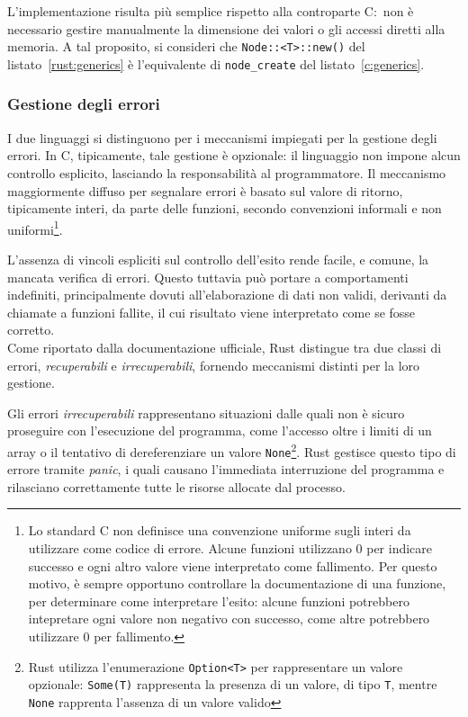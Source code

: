 L'implementazione risulta più semplice rispetto alla controparte C:\ non è necessario gestire manualmente la dimensione dei valori o gli accessi diretti alla memoria.
A tal proposito, si consideri che \texttt{Node::<T>::new()} del listato~\ref{rust:generics} è l'equivalente di \texttt{node\_create} del listato~\ref{c:generics}.

\subsubsection{Gestione degli errori}
I due linguaggi si distinguono per i meccanismi impiegati per la gestione degli errori.
In C, tipicamente, tale gestione è opzionale: il linguaggio non impone alcun controllo esplicito, lasciando la responsabilità al programmatore.
Il meccanismo maggiormente diffuso per segnalare errori è basato sul valore di ritorno, tipicamente interi, da parte delle funzioni, secondo
convenzioni informali e non uniformi\footnote{Lo standard C non definisce una convenzione uniforme sugli interi da utilizzare come codice di errore. Alcune funzioni
utilizzano 0 per indicare successo e ogni altro valore viene interpretato come fallimento. Per questo motivo, è sempre opportuno controllare la documentazione di una funzione,
per determinare come interpretare l'esito: alcune funzioni potrebbero intepretare ogni valore non negativo con successo, come altre potrebbero utilizzare 0 per fallimento.}.

L'assenza di vincoli espliciti sul controllo dell'esito rende facile, e comune, la mancata verifica di errori. 
Questo tuttavia può portare a comportamenti indefiniti, principalmente dovuti all'elaborazione di dati non validi, derivanti da
chiamate a funzioni fallite, il cui risultato viene interpretato come se fosse corretto. \hfill
\vspace{9pt}\\
\noindent Come riportato dalla documentazione ufficiale\cite{rust-book}, Rust distingue tra due classi di errori, 
\textit{recuperabili} e \textit{irrecuperabili}, fornendo meccanismi distinti per la loro gestione.

Gli errori \textit{irrecuperabili} rappresentano situazioni dalle quali non è sicuro proseguire con l'esecuzione del programma, come l'accesso oltre i limiti di un array o 
il tentativo di dereferenziare un valore \texttt{None}\footnote{Rust utilizza l'enumerazione \texttt{Option<T>} per rappresentare un valore opzionale: \texttt{Some(T)} rappresenta la presenza di un valore, di tipo \texttt{T}, mentre \texttt{None} rapprenta l'assenza di un valore valido}. 
Rust gestisce questo tipo di errore tramite \textit{panic}, i quali causano l'immediata interruzione del programma e rilasciano correttamente
tutte le risorse allocate dal processo.

